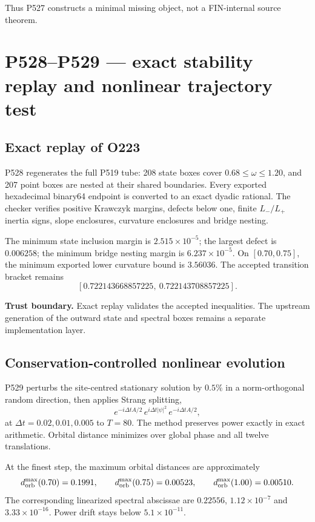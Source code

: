 \documentclass[11pt,a4paper]{article}
\begin{document}
Thus P527 constructs a minimal missing object, not a FIN-internal source theorem.

\section{P528--P529 --- exact stability replay and nonlinear trajectory test}

\subsection{Exact replay of O223}

P528 regenerates the full P519 tube: 208 state boxes cover $0.68\le\omega\le1.20$, and 207 point boxes are nested at their shared boundaries. Every exported hexadecimal binary64 endpoint is converted to an exact dyadic rational. The checker verifies positive Krawczyk margins, defects below one, finite $L_-/L_+$ inertia signs, slope enclosures, curvature enclosures and bridge nesting.

The minimum state inclusion margin is $2.515\times10^{-5}$; the largest defect is $0.006258$; the minimum bridge nesting margin is $6.237\times10^{-5}$. On $[0.70,0.75]$, the minimum exported lower curvature bound is $3.56036$. The accepted transition bracket remains
\[
 [0.722143668857225,\ 0.722143708857225].
\]

\textbf{Trust boundary.} Exact replay validates the accepted inequalities. The upstream generation of the outward state and spectral boxes remains a separate implementation layer.

\subsection{Conservation-controlled nonlinear evolution}

P529 perturbs the site-centred stationary solution by $0.5\%$ in a norm-orthogonal random direction, then applies Strang splitting,
\[
 e^{-i\Delta t A/2}\,e^{i\Delta t|\psi|^2}\,e^{-i\Delta t A/2},
\]
at $\Delta t=0.02,0.01,0.005$ to $T=80$. The method preserves power exactly in exact arithmetic. Orbital distance minimizes over global phase and all twelve translations.

At the finest step, the maximum orbital distances are approximately
\[
 d_{\rm orb}^{\max}(0.70)=0.1991,\qquad
 d_{\rm orb}^{\max}(0.75)=0.00523,\qquad
 d_{\rm orb}^{\max}(1.00)=0.00510.
\]
The corresponding linearized spectral abscissae are $0.22556$, $1.12\times10^{-7}$ and $3.33\times10^{-16}$. Power drift stays below $5.1\times10^{-11}$.
\end{document}
